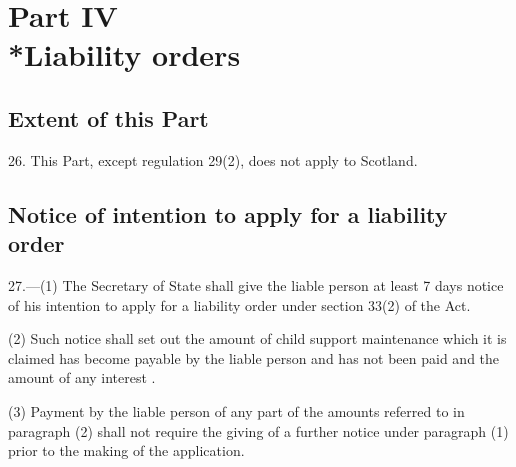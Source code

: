 \documentclass[12pt,a4paper]{article}
\begin{document}

\section[Part IV --- Liability orders]{Part IV\\*Liability orders}

\renewcommand\parthead{--- Part IV}

\subsection[26. Extent of this Part]{Extent of this Part}

26.  This Part, except regulation 29(2), does not apply to Scotland.

\subsection[27. Notice of intention to apply for a liability order]{Notice of intention to apply for a liability order}

27.—(1) The Secretary of State shall give the liable person at least 7 days notice of his intention to apply for a liability order under section 33(2) of the Act.

(2) Such notice shall set out the amount of child support maintenance which it is claimed has become payable by the liable person and has not been paid and the amount of any interest%
.  %

(3) Payment by the liable person of any part of the amounts referred to in paragraph (2) shall not require the giving of a further notice under paragraph (1) prior to the making of the application.

\end{document}
